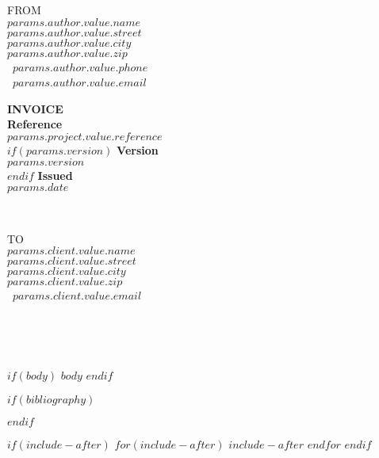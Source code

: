 \documentclass[
11pt,
a4paper,
twoside,
]{article}
\begin{document}
\vspace{0pt}
\begin{minipage}[t]{0.5\textwidth}
  \vspace{0pt}
  \begin{flushleft}
    \uppercase{From}                      \\
    \textbf{$params.author.value.name$}   \\
    $params.author.value.street$          \\
    $params.author.value.city$            \\
    $params.author.value.zip$             \\
    \faPhone\ $params.author.value.phone$ \\
    \faEnvelopeO\ $params.author.value.email$
  \end{flushleft}
\end{minipage}
\hfill
\begin{minipage}[t]{0.5\textwidth}
  \vspace{0pt}
  \begin{flushright}
    {\LARGE\bfseries\uppercase{Invoice}}\\
    {\bfseries Reference}               \\
    $params.project.value.reference$                   \\
    $if(params.version)$
    {\bfseries Version}                 \\
    $params.version$              \\
    $endif$
    {\bfseries Issued}                    \\
    $params.date$
  \end{flushright}
\end{minipage}\\[\baselineskip]
\begin{minipage}{1\textwidth}
  \begin{flushleft}
    \uppercase{To}\\
    \textbf{$params.client.value.name$}\\
    $params.client.value.street$\\
    $params.client.value.city$\\
    $params.client.value.zip$\\
    \faEnvelopeO\ $params.client.value.email$
  \end{flushleft}
\end{minipage}\\

\begin{center}
  {\large\bfseries{}}\\
  {\itshape{}}
\end{center}

$if(body)$
$body$
$endif$

$if(bibliography)$
\clearpage

$endif$

$if(include-after)$
\clearpage
$for(include-after)$
$include-after$
$endfor$
$endif$
\end{document}
